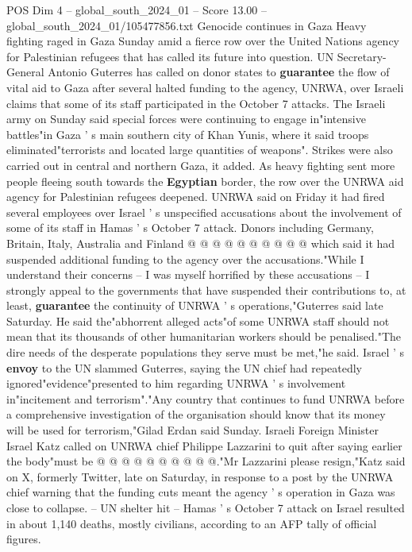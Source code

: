\begin{textsample}{POS Dim 4 – global\_south\_2024\_01 – Score 13.00 – global\_south\_2024\_01/105477856.txt}  \label{ex:f4_pos_379}
Genocide continues in Gaza Heavy fighting raged in Gaza Sunday amid a fierce row over the United Nations agency for Palestinian refugees that has called its future into question.
UN Secretary-General Antonio Guterres has called on donor states to \textbf{guarantee} the flow of vital aid to Gaza after several halted funding to the agency, UNRWA, over Israeli claims that some of its staff participated in the October 7 attacks.
The Israeli army on Sunday said special forces were continuing to engage in"intensive battles"in Gaza ' s main southern city of Khan Yunis, where it said troops eliminated"terrorists and located large quantities of weapons".
Strikes were also carried out in central and northern Gaza, it added.
As heavy fighting sent more people fleeing south towards the \textbf{Egyptian} border, the row over the UNRWA aid agency for Palestinian refugees deepened.
UNRWA said on Friday it had fired several employees over Israel ' s unspecified accusations about the involvement of some of its staff in Hamas ' s October 7 attack.
Donors including Germany, Britain, Italy, Australia and Finland @ @ @ @ @ @ @ @ @ @ which said it had suspended additional funding to the agency over the accusations."While I understand their concerns -- I was myself horrified by these accusations -- I strongly appeal to the governments that have suspended their contributions to, at least, \textbf{guarantee} the continuity of UNRWA ' s operations,"Guterres said late Saturday.
He said the"abhorrent alleged acts"of some UNRWA staff should not mean that its thousands of other humanitarian workers should be penalised."The dire needs of the desperate populations they serve must be met,"he said.
Israel ' s \textbf{envoy} to the UN slammed Guterres, saying the UN chief had repeatedly ignored"evidence"presented to him regarding UNRWA ' s involvement in"incitement and terrorism"."Any country that continues to fund UNRWA before a comprehensive investigation of the organisation should know that its money will be used for terrorism,"Gilad Erdan said Sunday.
Israeli Foreign Minister Israel Katz called on UNRWA chief Philippe Lazzarini to quit after saying earlier the body"must be @ @ @ @ @ @ @ @ @ @."Mr Lazzarini please resign,"Katz said on X, formerly Twitter, late on Saturday, in response to a post by the UNRWA chief warning that the funding cuts meant the agency ' s operation in Gaza was close to collapse. -- UN shelter hit -- Hamas ' s October 7 attack on Israel resulted in about 1,140 deaths, mostly civilians, according to an AFP tally of official figures.

\end{textsample}
